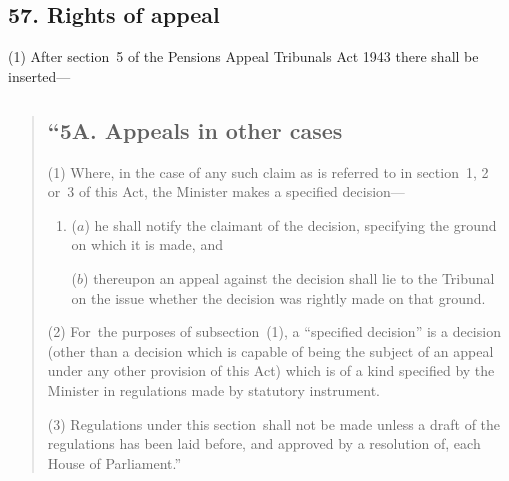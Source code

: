 \documentclass[12pt,a4paper]{article}
\begin{document}
\subsection{57. Rights of appeal}

(1) After section~5 of the Pensions Appeal Tribunals Act 1943 there shall be inserted—
\begin{quotation}
\subsection*{“5A. Appeals in other cases}

(1) Where, in the case of any such claim as is referred to in section~1, 2 or~3 of this Act, the Minister makes a specified decision—
\begin{enumerate}\item[]
($a$) he shall notify the claimant of the decision, specifying the ground on which it is made, and

($b$) thereupon an appeal against the decision shall lie to the Tribunal on the issue whether the decision was rightly made on that ground.
\end{enumerate}

(2) For~the purposes of subsection~(1), a “specified decision” is a decision (other than a decision which is capable of being the subject of an appeal under any other provision of this Act) which is of a kind specified by the Minister in regulations made by statutory instrument.

(3) Regulations under this section~shall not be made unless a draft of the regulations has been laid before, and approved by a resolution of, each House of Parliament.”
\end{quotation}

%

\end{document}
